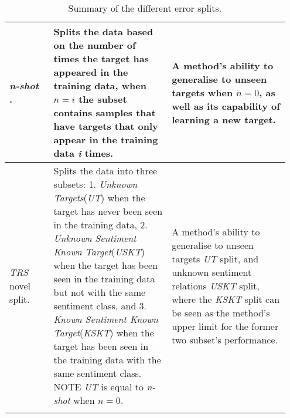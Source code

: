 \begin{longtable}{|p{0.15\linewidth}|p{0.4\linewidth}|p{0.4\linewidth}|}
\hline
\textit{n-shot} \citep{yang2018multi}. & Splits the data based on the number of times the target has appeared in the training data, when $n=i$ the subset contains samples that have targets that only appear in the training data \textit{i} times. & A method's ability to generalise to unseen targets when $n=0$, as well as its capability of learning a new target. \\
\hline
\textit{TRS} novel split. & Splits the data into three subsets: 1. \textit{Unknown Targets}(\textit{UT}) when the target has never been seen in the training data, 2. \textit{Unknown Sentiment Known Target}(\textit{USKT}) when the target has been seen in the training data but not with the same sentiment class, and 3. \textit{Known Sentiment Known Target}(\textit{KSKT}) when the target has been seen in the training data with the same sentiment class. NOTE \textit{UT} is equal to \textit{n-shot} when $n=0$. & A method's ability to generalise to unseen targets \textit{UT} split, and unknown sentiment relations \textit{USKT} split, where the \textit{KSKT} split can be seen as the method's upper limit for the former two subset's performance. \\
\hline
\caption{Summary of the different error splits.}
\label{table:aug_error_split_summary}
\end{longtable}